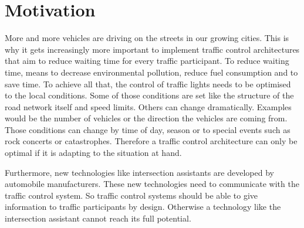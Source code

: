 \section{Motivation}
More and more vehicles are driving on the streets in our growing cities. This is why it gets increasingly more important to implement traffic control architectures that aim to reduce waiting time for every traffic participant. To reduce waiting time, means to decrease environmental pollution, reduce fuel consumption and to save time. To achieve all that, the control of traffic lights needs to be optimised to the local conditions. Some of those conditions are set like the structure of the road network itself and speed limits. Others can change dramatically. Examples would be the number of vehicles or the direction the vehicles are coming from. Those conditions can change by time of day, season or to special events such as rock concerts or catastrophes. Therefore a traffic control architecture can only be optimal if it is adapting to the situation at hand.

Furthermore, new technologies like intersection assistants are developed by automobile manufacturers. These new technologies need to communicate with the traffic control system. So traffic control systems should be able to give information to traffic participants by design. Otherwise a technology like the intersection assistant cannot reach its full potential.